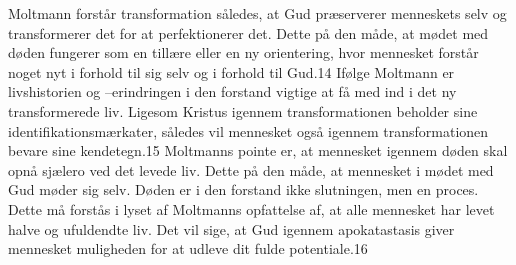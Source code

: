 Moltmann forstår transformation således, at Gud præserverer menneskets selv og transformerer det for at perfektionerer det. Dette på den måde, at mødet med døden fungerer som en tillære eller en ny orientering, hvor mennesket forstår noget nyt i forhold til sig selv og i forhold til Gud.14 Ifølge Moltmann er livshistorien og –erindringen i den forstand vigtige at få med ind i det ny transformerede liv. Ligesom Kristus igennem transformationen beholder sine identifikationsmærkater, således vil mennesket også igennem transformationen bevare sine kendetegn.15 Moltmanns pointe er, at mennesket igennem døden skal opnå sjælero ved det levede liv. Dette på den måde, at mennesket i mødet med Gud møder sig selv. Døden er i den forstand ikke slutningen, men en proces. Dette må forstås i lyset af Moltmanns opfattelse af, at alle mennesket har levet halve og ufuldendte liv. Det vil sige, at Gud igennem apokatastasis giver mennesket muligheden for at udleve dit fulde potentiale.16 

